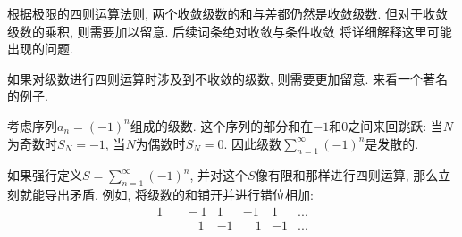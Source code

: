 根据极限的四则运算法则, 两个收敛级数的和与差都仍然是收敛级数. 但对于收敛级数的乘积, 则需要加以留意. 后续词条绝对收敛与条件收敛 将详细解释这里可能出现的问题.

如果对级数进行四则运算时涉及到不收敛的级数, 则需要更加留意. 来看一个著名的例子.

\begin{example}{}
考虑序列$a_n=(-1)^n$组成的级数. 这个序列的部分和在$-1$和$0$之间来回跳跃: 当$N$为奇数时$S_N=-1$, 当$N$为偶数时$S_N=0$. 因此级数$\sum_{n=1}^\infty(-1)^n$是发散的. 

如果强行定义$S=\sum_{n=1}^\infty(-1)^n$, 并对这个$S$像有限和那样进行四则运算, 那么立刻就能导出矛盾. 例如, 将级数的和铺开并进行错位相加:
$$
\begin{aligned}
1 & \quad-1 & 1 & -1 & 1 &...\\
  & \quad\quad1 & -1 & \quad1 & -1 &...
\end{aligned}
$$
\end{example}